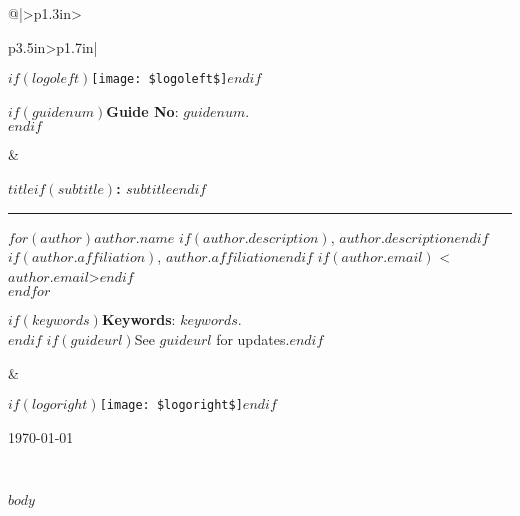 \documentclass[$if(fontsize)$$fontsize$$endif$,english,letterpaper]{scrartcl}
\providecommand{\tabularnewline}{\\}
\begin{document}
\setlength{\tabcolsep}{1pt}
\begin{tabular}{@{}|>{\centering}p{1.3in}>{\raggedright}p{3.5in}>{\raggedleft}p{1.7in}|}
\hline 
\begin{minipage}[c]{1in}%
  \begin{center}
    $if(logoleft)$\texttt{[image: \$logoleft\$]}$endif$
    \par
    \bigskip
    $if(guidenum)$\textbf{Guide No}: $guidenum$.\\$endif$
    \par
  \end{center}%
\end{minipage} & %
\begin{minipage}[c]{3.5in}%
  \begin{center}
     \begin{minipage}[t]{1\columnwidth}%
      \begin{center}
        \bigskip
        \textbf{\larger{}$title$$if(subtitle)$: $subtitle$$endif$}
      \end{center}
      \vspace{-15pt}
      \rule[0ex]{1\linewidth}{1pt}%
    \end{minipage}
    \par\end{center}{\Huge \par}
\begin{minipage}[t]{1\columnwidth}%
\begin{center}
  $for(author)$\textbf{$author.name$}%
  $if(author.description)$, $author.description$$endif$%
  $if(author.affiliation)$, $author.affiliation$$endif$%
  $if(author.email)$ <$author.email$>$endif$\\
  \smallskip
$endfor$
\par\end{center}%
\end{minipage}
\begin{flushleft}
  $if(keywords)$\textbf{Keywords}: $keywords$.\\$endif$
  $if(guideurl)$See $guideurl$ for updates.$endif$
  \par\end{flushleft}%
\smallskip
\end{minipage} & %

\begin{minipage}[c]{2in}%
\begin{center}
$if(logoright)$\texttt{[image: \$logoright\$]}$endif$
    \par
    \bigskip
    \crmda\today
\par\end{center}
\end{minipage} \tabularnewline
\hline 
\end{tabular}

\medskip{}


$body$
\end{document}
